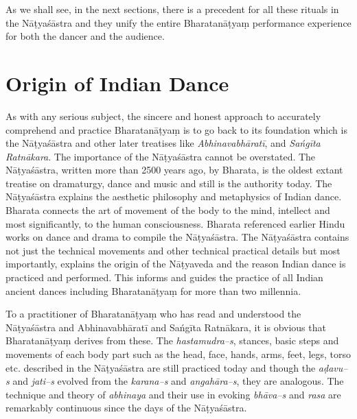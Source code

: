 As we shall see, in the next sections, there is a precedent for all these rituals in the Nāṭyaśāstra and they unify the entire Bharatanāṭyaṃ performance experience for both the dancer and the audience.


\section*{Origin of Indian Dance}

As with any serious subject, the sincere and honest approach to accurately comprehend and practice Bharatanāṭyaṃ is to go back to its foundation which is the Nāṭyaśāstra and other later treatises like \textit{Abhinavabhāratī}, and \textit{Sańgīta Ratnākara}. The importance of the Nāṭyaśāstra cannot be overstated. The Nāṭyaśāstra, written more than 2500 years ago, by Bharata, is the oldest extant treatise on dramaturgy, dance and music and still is the authority today. The Nāṭyaśāstra explains the aesthetic philosophy and metaphysics of Indian dance. Bharata connects the art of movement of the body to the mind, intellect and most significantly, to the human consciousness. Bharata referenced earlier Hindu works on dance and drama to compile the Nāṭyaśāstra. The Nāṭyaśāstra contains not just the technical movements and other technical practical details but most importantly, explains the origin of the Nāṭyaveda and the reason Indian dance is practiced and performed. This informs and guides the practice of all Indian ancient dances including Bharatanāṭyaṃ for more than two millennia. 

To a practitioner of Bharatanāṭyaṃ who has read and understood the Nāṭyaśāstra and Abhinavabhāratī and Sańgīta Ratnākara, it is obvious that Bharatanāṭyaṃ derives from these. The \textit{hastamudra–s}, stances, basic steps and movements of each body part such as the head, face, hands, arms, feet, legs, torso etc. described in the Nāṭyaśāstra are still practiced today and though the \textit{aḍavu–s }and \textit{jati–s }evolved from the \textit{karana–s} and \textit{angahāra–s}, they are analogous. The technique and theory of \textit{abhinaya} and their use in evoking \textit{bhāva–s} and \textit{rasa }are remarkably continuous since the days of the Nāṭyaśāstra.

